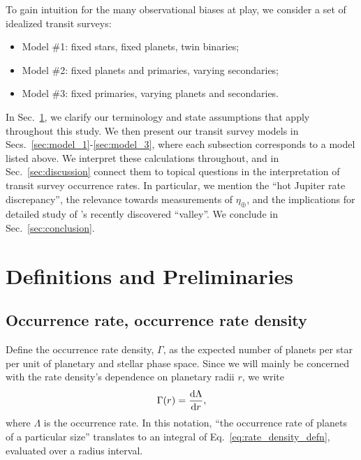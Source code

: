 \documentclass[12pt,modern]{aastex61}
\begin{document}
To gain intuition for the many observational biases at play,
we consider a set of idealized transit surveys:
\begin{itemize}
    \item Model \#1: fixed stars, fixed planets, twin binaries;
    \item Model \#2: fixed planets and primaries, varying secondaries;
    \item Model \#3: fixed primaries, varying planets and secondaries.
\end{itemize}
In Sec.~\ref{sec:definitions}, we clarify our terminology and state
assumptions that apply throughout this study.
We then present our transit survey models in 
Secs.~\ref{sec:model_1}-\ref{sec:model_3}, where 
each subsection corresponds to a model listed above.
We interpret these calculations throughout, and in 
Sec.~\ref{sec:discussion} connect them to topical questions in 
the interpretation of transit survey occurrence rates.
In particular, we mention the ``hot Jupiter rate discrepancy'', the relevance 
towards measurements of $\eta_\oplus$, and the implications for detailed 
study of \citet{fulton_california-_2017}'s recently discovered ``valley''.
We conclude in Sec.~\ref{sec:conclusion}.

%

\section{Definitions and Preliminaries}
\label{sec:definitions}

\subsection{Occurrence rate, occurrence rate density}
Define the occurrence rate density, $\Gamma$, as the expected number of 
planets per star per unit of planetary and stellar phase space.
Since we will mainly be concerned with the rate density's dependence on 
planetary radii $r$, we write
\begin{equation}
\Gamma(r) = \frac{{\rm d}\Lambda}{{\rm d}r},
\label{eq:rate_density_defn}
\end{equation}
where $\Lambda$ is the occurrence rate.
In this notation, ``the occurrence rate of planets of a particular size'' 
translates to an integral of Eq.~\ref{eq:rate_density_defn}, evaluated over a 
radius interval.
\end{document}
